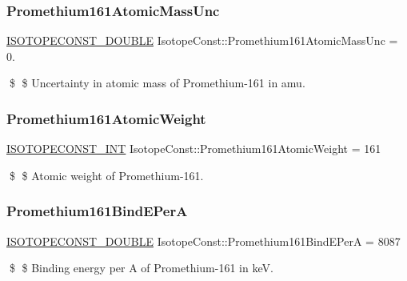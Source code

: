 \subsubsection{\texorpdfstring{Promethium161\+Atomic\+Mass\+Unc}{Promethium161AtomicMassUnc}}
{\footnotesize\ttfamily \mbox{\hyperlink{group___isotope_const-_macros_ga8f45a7272ce02c0b4c65c44636ed719a}{I\+S\+O\+T\+O\+P\+E\+C\+O\+N\+S\+T\+\_\+\+D\+O\+U\+B\+LE}} Isotope\+Const\+::\+Promethium161\+Atomic\+Mass\+Unc = 0.}

\$ \$ Uncertainty in atomic mass of Promethium-\/161 in amu. \mbox{\label{group___isotope_const-_promethium-_pm161_ga7337cab0ddfc7c6110721b4e8c9d97c3}} 
\subsubsection{\texorpdfstring{Promethium161\+Atomic\+Weight}{Promethium161AtomicWeight}}
{\footnotesize\ttfamily \mbox{\hyperlink{group___isotope_const-_macros_ga5f18360b3e99483a35c32d789e62621c}{I\+S\+O\+T\+O\+P\+E\+C\+O\+N\+S\+T\+\_\+\+I\+NT}} Isotope\+Const\+::\+Promethium161\+Atomic\+Weight = 161}

\$ \$ Atomic weight of Promethium-\/161. \mbox{\label{group___isotope_const-_promethium-_pm161_ga4d59a8be1b57fcb0f2a0dc4b85bd289b}} 
\subsubsection{\texorpdfstring{Promethium161\+Bind\+E\+PerA}{Promethium161BindEPerA}}
{\footnotesize\ttfamily \mbox{\hyperlink{group___isotope_const-_macros_ga8f45a7272ce02c0b4c65c44636ed719a}{I\+S\+O\+T\+O\+P\+E\+C\+O\+N\+S\+T\+\_\+\+D\+O\+U\+B\+LE}} Isotope\+Const\+::\+Promethium161\+Bind\+E\+PerA = 8087}

\$ \$ Binding energy per A of Promethium-\/161 in keV. \mbox{\label{group___isotope_const-_promethium-_pm161_ga310764cb882e42c885a5de894cc41f96}} 
